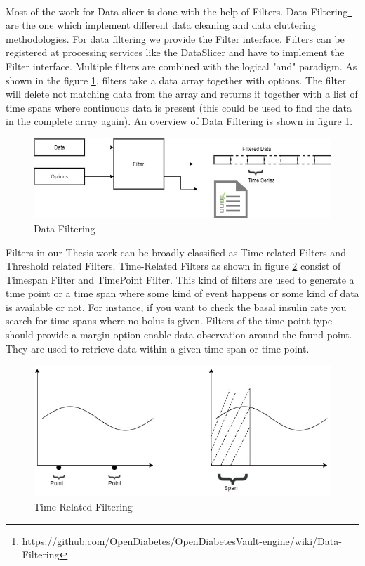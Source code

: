 \documentclass[article,type=msc,colorback,accentcolor=tud9c,twoside,11pt]{tudthesis}
\begin{document}
Most of the work for Data slicer is done with the help of Filters. Data Filtering\footnote{https://github.com/OpenDiabetes/OpenDiabetesVault-engine/wiki/Data-Filtering} are the one which implement different data cleaning and data cluttering methodologies. For data filtering we provide the Filter interface. Filters can be registered at processing services like the DataSlicer and have to implement the Filter interface. Multiple filters are combined with the logical "and" paradigm. As shown in the figure \ref{fig:Filters}, filters take a data array together with options. The filter will delete not matching data from the array and returns it together with a list of time spans where continuous data is present (this could be used to find the data in the complete array again).  An overview of Data Filtering is shown in figure \ref{fig:Filters}.
\begin{figure}[h]
	\centering
	\includegraphics[scale=0.7]{Filters.jpg}
	\caption{Data Filtering}
	\label{fig:Filters}
\end{figure}
Filters in our Thesis work can be broadly classified as Time related Filters and
Threshold related Filters. Time-Related Filters as shown in figure \ref{fig:TimeRelated} consist of Timespan Filter and TimePoint Filter. This kind of filters are used to generate a time point or a time span where some kind of event happens or some kind of data is available or not. For instance, if you want to check the basal insulin rate you search for time spans where no bolus is given. Filters of the time point type should provide a margin option enable data observation around the found point. They are used to retrieve data within a given time span or time point.
\begin{figure}[h]
	\centering
	\includegraphics[scale=0.7]{TimeRelated.jpg}
	\caption{Time Related Filtering}
	\label{fig:TimeRelated}
\end{figure}
\end{document}
